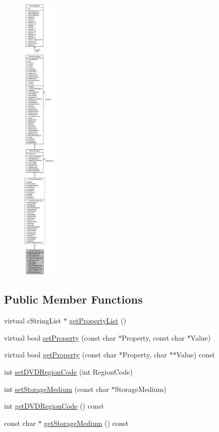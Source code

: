 \begin{figure}[H]
\begin{center}
\leavevmode
\includegraphics[height=400pt]{classcUPnPClassMovie__coll__graph}
\end{center}
\end{figure}
\subsection*{Public Member Functions}
\begin{CompactItemize}
\item 
virtual cStringList $\ast$ \hyperlink{classcUPnPClassMovie_b62e6dac175090b82c47f955e29c146c}{getPropertyList} ()
\item 
virtual bool \hyperlink{classcUPnPClassMovie_d7f990edda85f2caabe822d2ceeb2b0d}{setProperty} (const char $\ast$Property, const char $\ast$Value)
\item 
virtual bool \hyperlink{classcUPnPClassMovie_b4c1d5a973856469b93d2033b65d7ba2}{getProperty} (const char $\ast$Property, char $\ast$$\ast$Value) const 
\item 
int \hyperlink{classcUPnPClassMovie_3df7d1a4d798fddde1b379a2302a128c}{setDVDRegionCode} (int RegionCode)
\item 
int \hyperlink{classcUPnPClassMovie_136a1daa4c14c2d7397624eb288c463e}{setStorageMedium} (const char $\ast$StorageMedium)
\item 
int \hyperlink{classcUPnPClassMovie_80a41ba769974e80635b80aa3c41f66d}{getDVDRegionCode} () const 
\item 
const char $\ast$ \hyperlink{classcUPnPClassMovie_9fc36c7e0a1a465ec720b219a1710cc6}{getStorageMedium} () const 
\end{CompactItemize}
